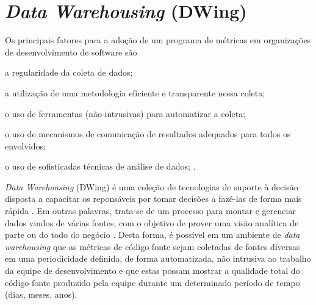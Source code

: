 \chapter{\textit{Data Warehousing} (DWing)} 

Os principais fatores para a adoção de um programa de métricas em 
organizações de desenvolvimento de software são\begin{inparaenum}[i)]
\item a regularidade da coleta de dados;
\item a utilização de uma metodologia eficiente e transparente nessa coleta; 
\item o uso de ferramentas (não-intrusivas) para automatizar a coleta; 
\item o uso de mecanismos de comunicação de resultados adequados para todos os envolvidos; 
\item o uso de sofisticadas técnicas de análise de dados;
.
\end{inparaenum} 


\textit{Data Warehousing} (DWing) é uma coleção de tecnologias de suporte à decisão disposta a capacitar os reponsáveis por tomar decisões a fazê-las de forma mais rápida . Em outras palavras, trata-se de um processo para montar e gerenciar dados vindos de várias fontes, com o objetivo de prover uma visão analítica de parte ou do todo do negócio \cite{gardner1998}. Desta forma, é possível em um ambiente de \textit{data warehousing} que as métricas de código-fonte sejam coletadas de fontes diversas em uma periodicidade definida, de forma automatizada, não intrusiva ao trabalho da equipe de desenvolvimento e que estas possam mostrar a qualidade total do código-fonte produzido pela equipe durante um determinado período de tempo (dias, meses, anos). 


